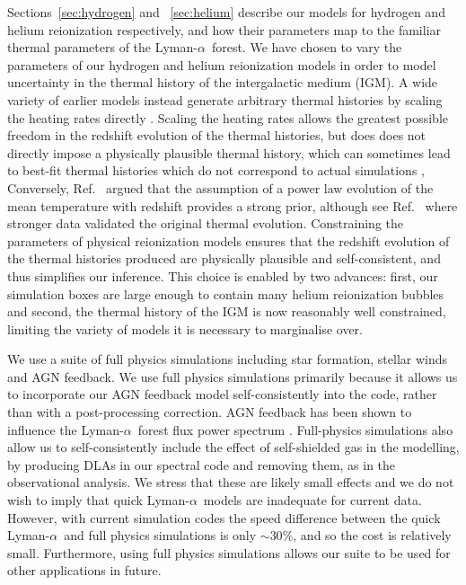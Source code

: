 \documentclass[a4paper,11pt]{article}
\newcommand{\Lya}{Lyman-$\alpha$}
\begin{document}
Sections~\ref{sec:hydrogen} and ~\ref{sec:helium} describe our models for hydrogen and helium reionization respectively, and how their parameters map to the familiar thermal parameters of the \Lya~forest. We have chosen to vary the parameters of our hydrogen and helium reionization models in order to model uncertainty in the thermal history of the intergalactic medium (IGM).
A wide variety of earlier models instead generate arbitrary thermal histories by scaling the heating rates directly \cite[e.g.~][]{Viel:2006}. Scaling the heating rates allows the greatest possible freedom in the redshift evolution of the thermal histories, but does does not directly impose a physically plausible thermal history, which can sometimes lead to best-fit thermal histories which do not correspond to actual simulations \cite{Walther:2019}, Conversely, Ref.~\cite{Garzilli:2019} argued that the assumption of a power law evolution of the mean temperature with redshift \cite{Viel:2013wdm, Irsic:2017} provides a strong prior, although see Ref.~\cite{Garzilli:2021} where stronger data validated the original thermal evolution. Constraining the parameters of physical reionization models ensures that the redshift evolution of the thermal histories produced are physically plausible and self-consistent, and thus simplifies our inference. This choice is enabled by two advances: first, our simulation boxes are large enough to contain many helium reionization bubbles and second, the thermal history of the IGM is now reasonably well constrained, limiting the variety of models it is necessary to marginalise over.

We use a suite of full physics simulations including star formation, stellar winds and AGN feedback. We use full physics simulations primarily because it allows us to incorporate our AGN feedback model self-consistently into the code, rather than with a post-processing correction. AGN feedback has been shown to influence the \Lya~forest flux power spectrum \cite{Viel:2013, Chabanier:2020}. Full-physics simulations also allow us to self-consistently include the effect of self-shielded gas in the modelling, by producing DLAs in our spectral code and removing them, as in the observational analysis. We stress that these are likely small effects and we do not wish to imply that quick \Lya~models are inadequate for current data. However, with current simulation codes the speed difference between the quick \Lya~and full physics simulations is only $\sim 30\%$, and so the cost is relatively small. Furthermore, using full physics simulations allows our suite to be used for other applications in future.
\end{document}
